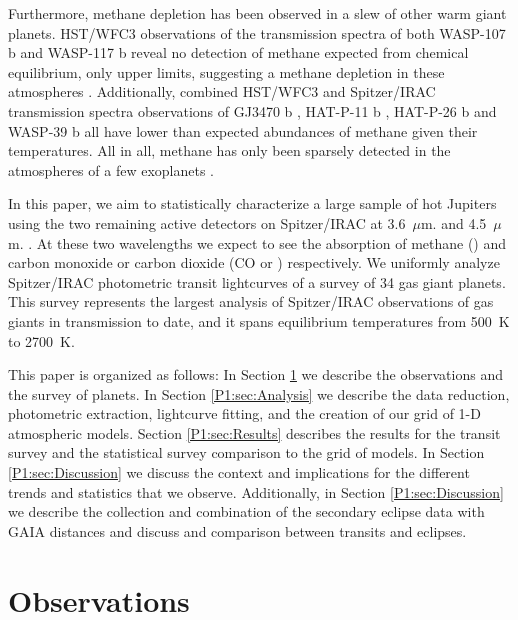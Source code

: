 Furthermore, methane depletion has been observed in a slew of other warm giant planets. HST/WFC3 observations of the transmission spectra of both WASP-107 b and WASP-117 b reveal no detection of methane expected from chemical equilibrium, only upper limits, suggesting a methane depletion in these atmospheres \citep{Kreidberg2018a, Spake2018, Carone2021}. Additionally, combined HST/WFC3 and Spitzer/IRAC transmission spectra observations of GJ3470 b \citep{Benneke2019}, HAT-P-11 b \citep{Chachan2019}, HAT-P-26 b \citep{Wakeford2017} and WASP-39 b \citep{Wakeford2018} all have lower than expected abundances of methane given their temperatures. All in all, methane has only been sparsely detected in the atmospheres of a few exoplanets \citep{Swain2008,Tinetti2010,Guilluy2019}.

In this paper, we aim to statistically characterize a large sample of hot Jupiters using the two remaining active detectors on Spitzer/IRAC at 3.6~$\mu$m. and 4.5~$\mu$m. \citep{Fazio2004, Werner2004}. At these two wavelengths we expect to see the absorption of methane () and carbon monoxide or carbon dioxide (CO or ) respectively. We uniformly analyze Spitzer/IRAC photometric transit lightcurves of a survey of 34 gas giant planets. This survey represents the largest analysis of Spitzer/IRAC observations of gas giants in transmission to date, and it spans equilibrium temperatures from 500~K to 2700~K.

This paper is organized as follows: In Section \ref{P1:sec:observations} we describe the observations and the survey of planets. In Section \ref{P1:sec:Analysis} we describe the data reduction, photometric extraction, lightcurve fitting, and the creation of our grid of 1-D atmospheric models. Section \ref{P1:sec:Results} describes the results for the transit survey and the statistical survey comparison to the grid of models. In Section \ref{P1:sec:Discussion} we discuss the context and implications for the different trends and statistics that we observe. Additionally, in Section \ref{P1:sec:Discussion} we describe the collection and combination of the secondary eclipse data with GAIA distances and discuss and comparison between transits and eclipses.

\section{Observations}

\label{P1:sec:observations}

